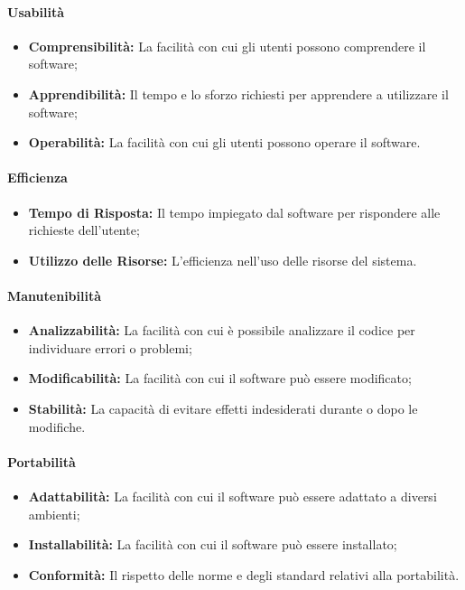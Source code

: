 \paragraph{Usabilità}
\begin{itemize}
    \item \textbf{Comprensibilità:} La facilità con cui gli utenti possono comprendere il software;
    \item \textbf{Apprendibilità:} Il tempo e lo sforzo richiesti per apprendere a utilizzare il software;
    \item \textbf{Operabilità:} La facilità con cui gli utenti possono operare il software.
\end{itemize}

\paragraph{Efficienza}
\begin{itemize}
    \item \textbf{Tempo di Risposta:} Il tempo impiegato dal software per rispondere alle richieste dell'utente;
    \item \textbf{Utilizzo delle Risorse:} L'efficienza nell'uso delle risorse del sistema.
\end{itemize}

\paragraph{Manutenibilità}
\begin{itemize}
    \item \textbf{Analizzabilità:} La facilità con cui è possibile analizzare il codice per individuare errori o problemi;
    \item \textbf{Modificabilità:} La facilità con cui il software può essere modificato;
    \item \textbf{Stabilità:} La capacità di evitare effetti indesiderati durante o dopo le modifiche.
\end{itemize}

\paragraph{Portabilità}
\begin{itemize}
    \item \textbf{Adattabilità:} La facilità con cui il software può essere adattato a diversi ambienti;
    \item \textbf{Installabilità:} La facilità con cui il software può essere installato;
    \item \textbf{Conformità:} Il rispetto delle norme e degli standard relativi alla portabilità.
\end{itemize}


